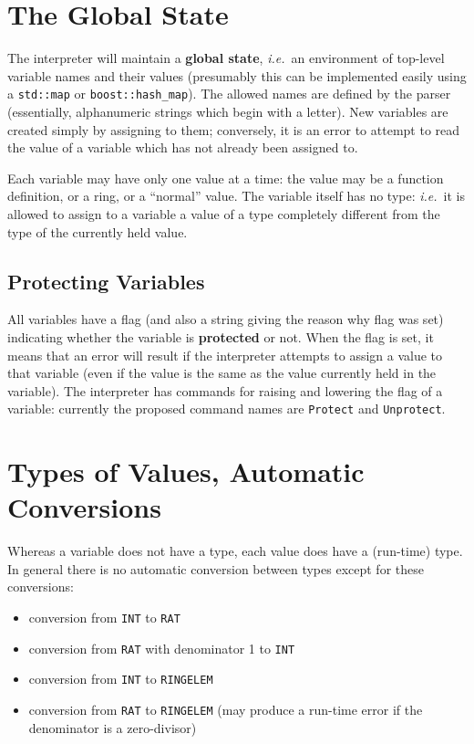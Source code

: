 \documentclass{book}[12,a4paper]
\def\ie{{\it i.e.}}
\begin{document}
\section{The Global State}
\label{global-state}

The interpreter will maintain a {\bf global state}, \ie~an environment of
top-level variable names and their values (presumably this can be implemented
easily using a \verb|std::map| or \verb|boost::hash_map|).  The allowed names are defined
by the parser (essentially, alphanumeric strings which begin with a
letter).  New variables are created simply by assigning to them; conversely,
it is an error to attempt to read the value of a variable which has not
already been assigned to.

Each variable may have only one value at a time: the value may be a
function definition, or a ring, or a ``normal'' value.  The variable itself
has no type: \ie~it is allowed to assign to a variable a value of a type
completely different from the type of the currently held value.

\subsection{Protecting Variables}

All variables have a flag (and also a string giving the reason why flag was
set)
indicating whether the variable is {\bf protected} or not.  When the flag
is set, it means that an error will result if the interpreter attempts to
assign a value to that variable (even if the value is the same as the value
currently held in the variable).  The interpreter has commands for raising
and lowering the flag of a variable: currently the proposed command names are
\texttt{Protect} and \texttt{Unprotect}.


\section{Types of Values, Automatic Conversions}

Whereas a variable does not have a type, each value does have a (run-time)
type.  In general there is no automatic conversion between types except
for these conversions:
\begin{itemize}
\item conversion from \texttt{INT} to \texttt{RAT}
\item conversion from \texttt{RAT} with denominator 1 to \texttt{INT}
\item conversion from \texttt{INT} to \texttt{RINGELEM}
\item conversion from \texttt{RAT} to \texttt{RINGELEM} (may produce a
run-time error if the denominator is a zero-divisor)
\end{itemize}
\end{document}
